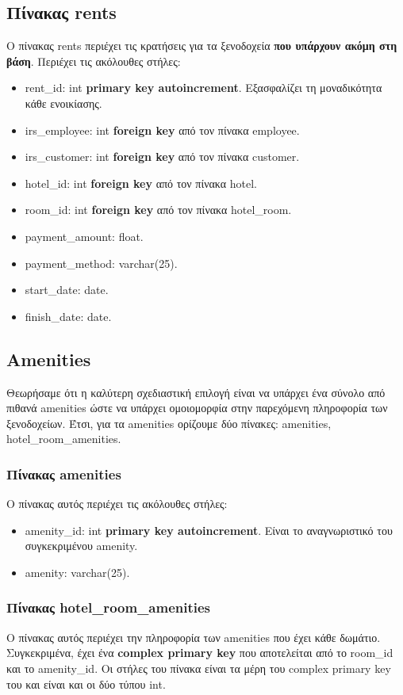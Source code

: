\documentclass[a4paper,oneside, 11pt]{article}
\begin{document}
\subsection{Πίνακας rents}
Ο πίνακας rents περιέχει τις κρατήσεις για τα ξενοδοχεία \textbf{που υπάρχουν ακόμη στη βάση}. Περιέχει τις ακόλουθες στήλες:
\begin{itemize}
\item rent\_id: int \textbf{primary key autoincrement}. Εξασφαλίζει τη μοναδικότητα κάθε ενοικίασης.
\item irs\_employee: int \textbf{foreign key} από τον πίνακα employee.
\item irs\_customer: int \textbf{foreign key} από τον πίνακα customer.
\item hotel\_id: int \textbf{foreign key} από τον πίνακα hotel.
\item room\_id: int \textbf{foreign key} από τον πίνακα hotel\_room.
\item payment\_amount: float.
\item payment\_method: varchar(25).
\item start\_date: date.
\item finish\_date: date.
\end{itemize}

\subsection{Amenities}
Θεωρήσαμε ότι η καλύτερη σχεδιαστική επιλογή είναι να υπάρχει ένα σύνολο από πιθανά amenities ώστε να υπάρχει ομοιομορφία στην παρεχόμενη πληροφορία των ξενοδοχείων. Έτσι, για τα amenities ορίζουμε δύο πίνακες: amenities, hotel\_room\_amenities.

\subsubsection{Πίνακας amenities}
Ο πίνακας αυτός περιέχει τις ακόλουθες στήλες:
\begin{itemize}
\item amenity\_id: int \textbf{primary key autoincrement}. Είναι το αναγνωριστικό του συγκεκριμένου amenity.
\item amenity: varchar(25). 
\end{itemize}
\subsubsection{Πίνακας hotel\_room\_amenities}
Ο πίνακας αυτός περιέχει την πληροφορία των amenities που έχει κάθε δωμάτιο. Συγκεκριμένα, έχει ένα \textbf{complex primary key} που αποτελείται από το room\_id και το amenity\_id. Οι στήλες του πίνακα είναι τα μέρη του complex primary key του και είναι και οι δύο τύπου int.
\end{document}
